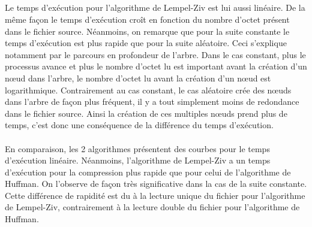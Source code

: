 \documentclass{report}
\begin{document}
\subparagraph*{}
Le temps d'exécution pour l'algorithme de Lempel-Ziv est lui aussi linéaire. De la même façon le temps d'exécution croît en fonction du nombre d'octet présent dans le fichier source. Néanmoins, on remarque que pour la suite constante le temps d'exécution est plus rapide que pour la suite aléatoire. Ceci s'explique notamment par le parcours en profondeur de l'arbre. Dans le cas constant, plus le processus avance et plus le nombre d'octet lu est important avant la création d'un nœud dans l'arbre, le nombre d'octet lu avant la création d'un nœud est logarithmique. Contrairement au cas constant, le cas aléatoire crée des nœuds dans l'arbre de façon plus fréquent, il y a tout simplement moins de redondance dans le fichier source. Ainsi la création de ces multiples nœuds prend plus de temps, c'est donc une conséquence de la différence du temps d'exécution.

\paragraph*{}
En comparaison, les 2 algorithmes présentent des courbes pour le temps d'exécution linéaire. Néanmoins, l'algorithme de Lempel-Ziv a un temps d'exécution pour la compression plus rapide que pour celui de l'algorithme de Huffman. On l'observe de façon très significative dans la cas de la suite constante. Cette différence de rapidité est du à la lecture unique du fichier pour l'algorithme de Lempel-Ziv, contrairement à la lecture double du fichier pour l'algorithme de Huffman.	

\paragraph*{}
\end{document}
